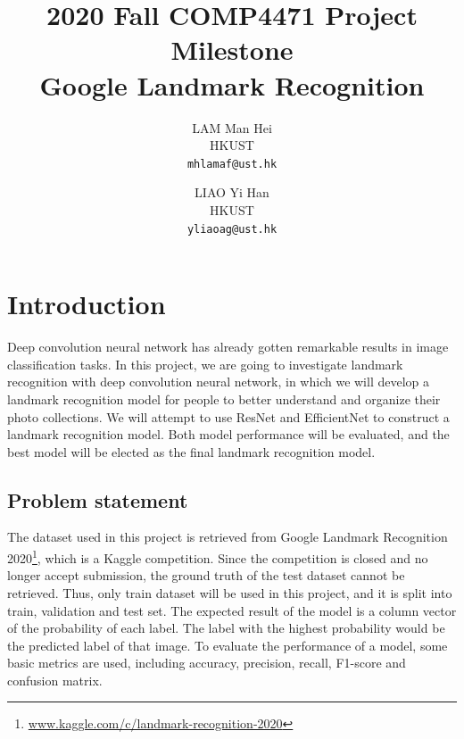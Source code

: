 \documentclass[10pt,twocolumn,letterpaper]{article}
\begin{document}
\title{2020 Fall COMP4471 Project Milestone\\Google Landmark Recognition}

\author{LAM Man Hei\\
HKUST\\
{\tt\small mhlamaf@ust.hk}
\and
LIAO Yi Han\\
HKUST\\
{\tt\small yliaoag@ust.hk}
}

\maketitle

\section{Introduction}
Deep convolution neural network has already gotten remarkable results in image classification tasks. In this project, we are going to investigate landmark recognition with deep convolution neural network, in which we will develop a landmark recognition model for people to better understand and organize their photo collections. We will attempt to use ResNet\cite{he_deep_2015} and EfficientNet\cite{tan_efficientnet_2020} to construct a landmark recognition model. Both model performance will be evaluated, and the best model will be elected as the final landmark recognition model.

\subsection{Problem statement}
The dataset used in this project is retrieved from Google Landmark Recognition 2020\footnote{\url{www.kaggle.com/c/landmark-recognition-2020}}, which is a Kaggle competition. Since the competition is closed and no longer accept submission, the ground truth of the test dataset cannot be retrieved. Thus, only train dataset will be used in this project, and it is split into train, validation and test set. The expected result of the model is a column vector of the probability of each label. The label with the highest probability would be the predicted label of that image. To evaluate the performance of a model, some basic metrics are used, including accuracy, precision, recall, F1-score and confusion matrix.
\end{document}
